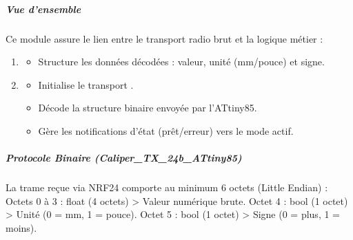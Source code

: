 \documentclass[letterpaper,10pt,french]{sphinxmanual}
\begin{document}
\subparagraph{Vue d’ensemble}
\label{\detokenize{api/hardware.devices:vue-d-ensemble}}
\sphinxAtStartPar
Ce module assure le lien entre le transport radio brut et la logique métier :
\begin{enumerate}
%
\item {} \begin{itemize}
\item {} 
\sphinxAtStartPar
Structure les données décodées : valeur, unité (mm/pouce) et signe.

\end{itemize}

\item {} \begin{itemize}
\item {} 
\sphinxAtStartPar
Initialise le transport .

\item {} 
\sphinxAtStartPar
Décode la structure binaire  envoyée par l’ATtiny85.

\item {} 
\sphinxAtStartPar
Gère les notifications d’état (prêt/erreur) vers le mode actif.

\end{itemize}

\end{enumerate}


\subparagraph{Protocole Binaire (Caliper\_TX\_24b\_ATtiny85)}
\label{\detokenize{api/hardware.devices:protocole-binaire-caliper-tx-24b-attiny85}}
\sphinxAtStartPar
La trame reçue via NRF24 comporte au minimum 6 octets (Little Endian) :
\sphinxhyphen{} Octets 0 à 3 : float (4 octets) \sphinxhyphen{}\textgreater{} Valeur numérique brute.
\sphinxhyphen{} Octet 4      : bool (1 octet)  \sphinxhyphen{}\textgreater{} Unité (0 = mm, 1 = pouce).
\sphinxhyphen{} Octet 5      : bool (1 octet)  \sphinxhyphen{}\textgreater{} Signe (0 = plus, 1 = moins).
\end{document}

